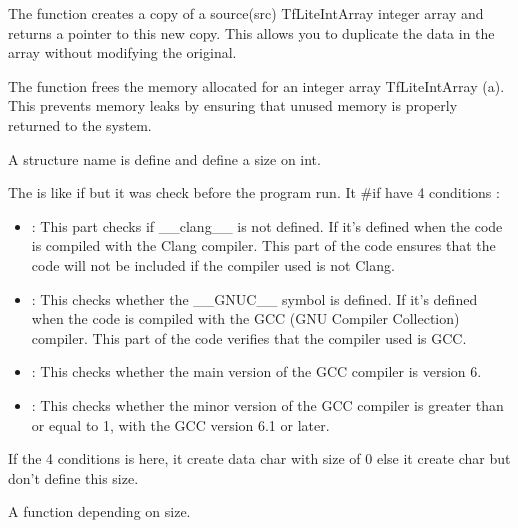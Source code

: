 The function  creates a copy of a source(src) TfLiteIntArray integer array and returns a pointer to this new copy. This allows you to duplicate the data in the array without modifying the original.

The function  frees the memory allocated for an integer array TfLiteIntArray (a). This prevents memory leaks by ensuring that unused memory is properly returned to the system.


A structure name  is define and define a size on int. 

\begin{center}
    \label{Figure:Comatibily}
\end{center}

The  is like if but it was check before the program run. It \#if have 4 conditions : 

\begin{itemize}
    \item {}: This part checks if \_\_clang\_\_ is not defined. If it's defined when the code is compiled with the Clang compiler.  This part of the code ensures that the code will not be included if the compiler used is not Clang.
    
    \item {}: This checks whether the \_\_GNUC\_\_ symbol is defined. If it's defined when the code is compiled with the GCC (GNU Compiler Collection) compiler. This part of the code verifies that the compiler used is GCC.
    
    \item {} : This checks whether the main version of the GCC compiler is version 6.
    
    \item {}: This checks whether the minor version of the GCC compiler is greater than or equal to 1, with the GCC version 6.1 or later.
\end{itemize}

If the 4 conditions is here, it create data char with  size of 0 else it create char but don't define this size. 

A function  depending on size. 


